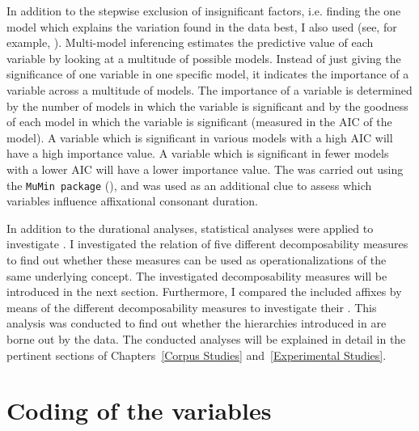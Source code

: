 In addition to the stepwise exclusion of insignificant factors, i.e. finding the one model which explains the variation found in the data best, I also used  (see, for example, \citealt{Barth.2014}). Multi-model inferencing estimates the predictive value of each variable by looking at a multitude of possible models. Instead of just giving the significance of one variable in one specific model, it indicates the importance of a variable across a multitude of models. 
The importance of a variable is determined by the number of models in which the variable is significant and by the goodness of each model in which the variable is significant (measured in the AIC of the model). A variable which is significant in various models with a high AIC will have a high importance value. A variable which is significant in fewer models with a lower AIC will have a lower importance value. The  was carried out using the \texttt{MuMin package} (\citealt{Barton.2016}), and was used as an additional clue to assess which variables influence affixational consonant duration.

In addition to the durational analyses, statistical analyses were applied to investigate . 
I investigated the relation of five different decomposability measures to find out whether these measures can be used as operationalizations of the same underlying concept. The investigated decomposability measures will be introduced in the next section. 
Furthermore, I compared the included affixes by means of the different decomposability measures to investigate their . This analysis was conducted to find out whether the  hierarchies introduced in  are borne out by the data. 
The conducted  analyses will be explained in detail in the pertinent sections of Chapters~\ref{Corpus Studies} and~\ref{Experimental Studies}. 



\section{Coding of the variables} \label{General method annotation}

